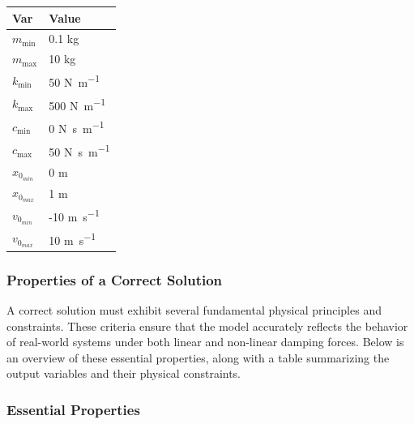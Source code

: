 \documentclass[12pt]{article}
\begin{document}
\begin{table}[h]
\caption{Specification Parameter Values} \label{TblSpecParams}
\renewcommand{\arraystretch}{1.2}
\noindent \begin{longtable*}{l l} 
  \toprule
  \textbf{Var} & \textbf{Value} \\
  \midrule 
  $m_\text{min}$ & 0.1 \si{\kilogram}\\
  $m_\text{max}$ & 10 \si{\kilogram}\\

  $k_\text{min}$ & 50 \si{\newton\per\meter}\\
  $k_\text{max}$ & 500 \si{\newton\per\meter}\\

  $c_\text{min}$ & 0 \si{\newton\second\per\metre}\\
  $c_\text{max}$ & 50 \si{\newton\second\per\metre}\\

  $x_{0_{min}}$ & 0 \si{\metre}\\
  $x_{0_{max}}$ & 1 \si{\metre}\\

  $v_{0_{min}}$ & -10 \si{\metre\per\second}\\
  $v_{0_{max}}$ & 10 \si{\metre\per\second}\\
  \bottomrule
\end{longtable*}
\end{table}

\newpage

\subsubsection{Properties of a Correct Solution} \label{sec_CorrectSolution}

\noindent
A correct solution must exhibit several fundamental physical principles and 
constraints. These criteria ensure that the model accurately reflects the 
behavior of real-world systems under both linear and non-linear damping 
forces. Below is an overview of these essential properties, along with a 
table summarizing the output variables and their physical constraints.

\subsubsection*{Essential Properties}
\end{document}
